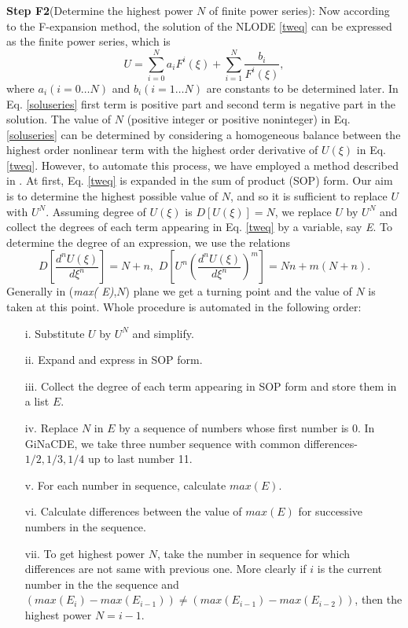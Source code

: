 \documentclass[prd,aps,floats,showkeys,nofootinbib,notitlepage]{revtex4-2}
\begin{document}
	\textbf{Step F2}(Determine the highest power $N$ of finite power series): 
	Now according to the F-expansion method, the solution of the NLODE \eqref{tweq} can be expressed as the finite power series, which is
	\begin{equation}\label{soluseries}
		U =  \sum\limits_{i = 0}^N {a_i{F^i}(\xi )}+\sum\limits_{i = 1}^N {\frac{{{b_i}}}{{F^i}(\xi )}},
	\end{equation}
	where $a_i(i=0\ldots N)$ and $b_i(i=1\ldots N)$ are constants to be determined later.
	In Eq. \eqref{soluseries} first term is positive part and second term is negative part in the solution. The value of $N$ (positive integer or positive noninteger) in Eq. \eqref{soluseries} can be determined by considering a homogeneous balance between the highest order nonlinear term with the highest order derivative of $U(\xi)$ in Eq. \eqref{tweq}.
	However, to automate this process, we have employed a method described in \cite{rath}. At first, Eq. \eqref{tweq} is expanded in the sum of product (SOP) form. Our aim is to determine the highest possible value of $N$, and so it is sufficient to replace $U$ with $U^N$. Assuming degree of $U(\xi)$ is $D[U(\xi)]=N$, we replace $U$ by $U^N$ and collect the degrees of each term appearing in Eq. \eqref{tweq} by a variable, say {\em E}. To determine the degree of an expression, we use the relations
	\begin{equation}\label{degRltn}
		D\left[ {\frac{{{d^n}U(\xi )}}{{d{\xi ^n}}}} \right] = N + n,\,\,D\left[ {{U^n}{{\left( {\frac{{{d^n}U(\xi )}}{{d{\xi ^n}}}} \right)}^m}} \right] = Nn + m(N + n).
	\end{equation}
	Generally in ({\em max( E)},$N$) plane we get a turning point and the value of $N$ is taken at this point. Whole procedure is automated in the following order:
	\begin{itemize}
		\item[i.] Substitute $U$ by $U^N$ and simplify.
		\item[ii.] Expand and express in SOP form.
		\item[iii.] Collect the degree of each term appearing in SOP form and store them in a list $ E$.
		\item[iv.] Replace $N$ in $E$ by a sequence of numbers whose first number is 0. In GiNaCDE, we take three  number sequence with common differences- $1/2,1/3,1/4$ up to last number 11.
		\item[v.] For each number in sequence, calculate $ max( E)$.
		\item[vi.] Calculate differences between the value of  $ max( E)$ for successive numbers in the sequence.
		\item[vii.] To get highest power $N$, take the number in sequence for which differences are not same with previous one. More clearly if $i$ is the current number in the the sequence and $ ({max(E_i)} - {max(E_{i - 1})}) \ne ({max(E_{i - 1})} - {max(E_{i - 2})})$, then the highest power $N=i-1$.   
	\end{itemize}
\end{document}
